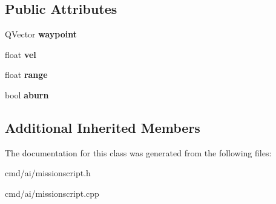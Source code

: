 \subsection*{Public Attributes}
\begin{DoxyCompactItemize}
\item 
Q\+Vector {\bfseries waypoint}\hypertarget{classAIFlyToWaypointDefend_a55419470ced05c17d70a4f94a1a2c2e2}{}\label{classAIFlyToWaypointDefend_a55419470ced05c17d70a4f94a1a2c2e2}

\item 
float {\bfseries vel}\hypertarget{classAIFlyToWaypointDefend_ac5c09b26527765447a9cbb71ec5e7bfd}{}\label{classAIFlyToWaypointDefend_ac5c09b26527765447a9cbb71ec5e7bfd}

\item 
float {\bfseries range}\hypertarget{classAIFlyToWaypointDefend_a3d78cda4a9891654d400673368a99c9d}{}\label{classAIFlyToWaypointDefend_a3d78cda4a9891654d400673368a99c9d}

\item 
bool {\bfseries aburn}\hypertarget{classAIFlyToWaypointDefend_a50022d762aad72bbded0069594750d6a}{}\label{classAIFlyToWaypointDefend_a50022d762aad72bbded0069594750d6a}

\end{DoxyCompactItemize}
\subsection*{Additional Inherited Members}


The documentation for this class was generated from the following files\+:\begin{DoxyCompactItemize}
\item 
cmd/ai/missionscript.\+h\item 
cmd/ai/missionscript.\+cpp\end{DoxyCompactItemize}
